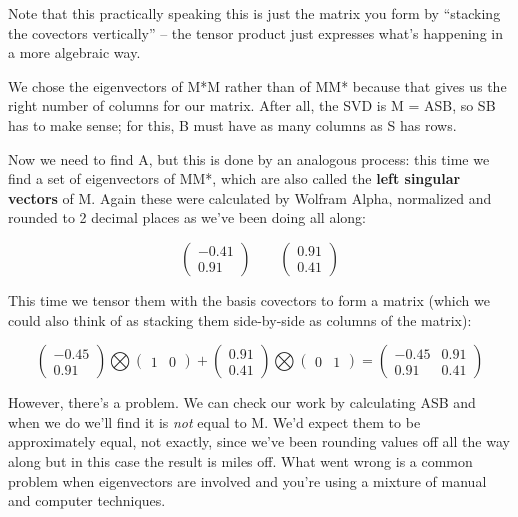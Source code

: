 \documentclass[oneside,english]{amsbook}
\numberwithin{section}{chapter}
\theoremstyle{plain}
\theoremstyle{definition}
\begin{document}
Note that this practically speaking this is just the matrix you form by
``stacking the covectors vertically'' -- the tensor product just
expresses what's happening in a more algebraic way.

We chose the eigenvectors of M*M rather than of MM* because that gives
us the right number of columns for our matrix. After all, the SVD is M =
ASB, so SB has to make sense; for this, B must have as many columns as S
has rows.

Now we need to find A, but this is done by an analogous process: this
time we find a set of eigenvectors of MM*, which are also called the
\textbf{left singular vectors} of M. Again these were calculated by
Wolfram Alpha, normalized and rounded to 2 decimal places as we've been
doing all along:

\[\begin{pmatrix}
	- 0.41 \\
	0.91
\end{pmatrix}\ \ \ \ \ \ \ \ \ \begin{pmatrix}
	0.91 \\
	0.41
\end{pmatrix}\]

This time we tensor them with the basis covectors to form a matrix
(which we could also think of as stacking them side-by-side as columns
of the matrix):

\[\begin{pmatrix}
	- 0.45 \\
	0.91
\end{pmatrix}\bigotimes\begin{pmatrix}
	1 & 0
\end{pmatrix} + \begin{pmatrix}
	0.91 \\
	0.41
\end{pmatrix}\bigotimes\begin{pmatrix}
	0 & 1
\end{pmatrix} = \begin{pmatrix}
	- 0.45 & 0.91 \\
	0.91 & 0.41
\end{pmatrix}\]

However, there's a problem. We can check our work by calculating ASB and
when we do we'll find it is \emph{not} equal to M. We'd expect them to
be approximately equal, not exactly, since we've been rounding values
off all the way along but in this case the result is miles off. What
went wrong is a common problem when eigenvectors are involved and you're
using a mixture of manual and computer techniques.
\end{document}
